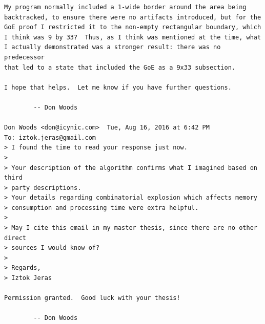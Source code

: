 \documentclass[12pt,a4paper,openany,twoside]{book}
\begin{document}
\begin{Verbatim}[fontsize=\small]
My program normally included a 1-wide border around the area being
backtracked, to ensure there were no artifacts introduced, but for the
GoE proof I restricted it to the non-empty rectangular boundary, which
I think was 9 by 33?  Thus, as I think was mentioned at the time, what
I actually demonstrated was a stronger result: there was no predecessor
that led to a state that included the GoE as a 9x33 subsection.

I hope that helps.  Let me know if you have further questions.

        -- Don Woods

Don Woods <don@icynic.com>	Tue, Aug 16, 2016 at 6:42 PM
To: iztok.jeras@gmail.com
> I found the time to read your response just now.
>
> Your description of the algorithm confirms what I imagined based on third
> party descriptions.
> Your details regarding combinatorial explosion which affects memory
> consumption and processing time were extra helpful.
>
> May I cite this email in my master thesis, since there are no other direct
> sources I would know of?
>
> Regards,
> Iztok Jeras

Permission granted.  Good luck with your thesis!

        -- Don Woods
\end{Verbatim}



\newpage
{}
\listoffigures




\newpage


%
\label{stran_literatura}
 

\end{document}
